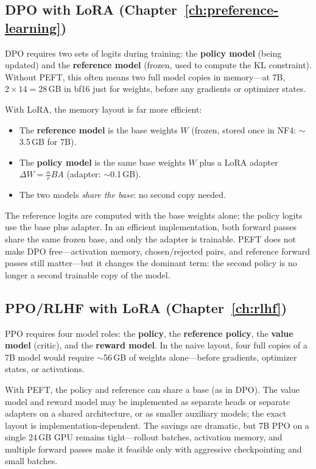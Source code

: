 \subsection{DPO with LoRA (Chapter~\ref{ch:preference-learning})}

DPO requires two sets of logits during training: the \textbf{policy model} (being updated) and the \textbf{reference model} (frozen, used to compute the KL constraint). Without PEFT, this often means two full model copies in memory---at 7B, $2 \times 14 = 28$\,GB in bf16 just for weights, before any gradients or optimizer states.

With LoRA, the memory layout is far more efficient:

\begin{itemize}[nosep]
  \item The \textbf{reference model} is the base weights $W$ (frozen, stored once in NF4: $\sim$3.5\,GB for 7B).
  \item The \textbf{policy model} is the same base weights $W$ plus a LoRA adapter $\Delta W = \frac{\alpha}{r} BA$ (adapter: $\sim$0.1\,GB).
  \item The two models \emph{share the base}: no second copy needed.
\end{itemize}

The reference logits are computed with the base weights alone; the policy logits use the base plus adapter. In an efficient implementation, both forward passes share the same frozen base, and only the adapter is trainable. PEFT does not make DPO free---activation memory, chosen/rejected pairs, and reference forward passes still matter---but it changes the dominant term: the second policy is no longer a second trainable copy of the model.

\subsection{PPO/RLHF with LoRA (Chapter~\ref{ch:rlhf})}

PPO requires four model roles: the \textbf{policy}, the \textbf{reference policy}, the \textbf{value model} (critic), and the \textbf{reward model}. In the naive layout, four full copies of a 7B model would require $\sim$56\,GB of weights alone---before gradients, optimizer states, or activations.

With PEFT, the policy and reference can share a base (as in DPO). The value model and reward model may be implemented as separate heads or separate adapters on a shared architecture, or as smaller auxiliary models; the exact layout is implementation-dependent. The savings are dramatic, but 7B PPO on a single 24\,GB GPU remains tight---rollout batches, activation memory, and multiple forward passes make it feasible only with aggressive checkpointing and small batches.

